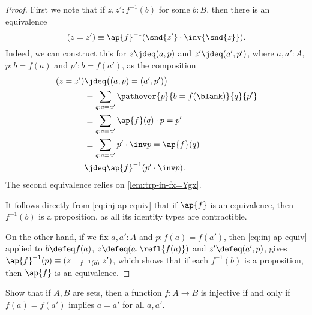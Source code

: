 \begin{proof}
  First we note that if $z,z' : f^{-1}(b)$ for some $b:B$,
  then there is an equivalence
  \begin{equation}\label{eq:inj-ap-equiv}
    (z = z') \equiv \ap{f}^{-1}(\snd{z'} \cdot \inv{\snd{z}}).
  \end{equation}
  Indeed, we can construct this for $z\jdeq(a,p)$ and $z'\jdeq(a',p')$,
  where $a,a':A$, $p:b=f(a)$ and $p':b=f(a')$,
  as the composition
  \begin{align*}
    (z = z')
    &\jdeq \bigl( (a,p) = (a',p') \bigr) \\
    &\equiv \sum_{q : a=a'} \pathover{p}{b=f(\blank)}{q}{p'} \\
    &\equiv \sum_{q : a=a'} \ap{f}(q) \cdot p = p' \\
    &\equiv \sum_{q : a=a'} p' \cdot \inv p = \ap{f}(q) \\
    &\jdeq \ap{f}^{-1}(p' \cdot \inv p).
  \end{align*}
  The second equivalence relies on \cref{lem:trp-in-fx=Ygx}.

  It follows directly from \eqref{eq:inj-ap-equiv}
  that if $\ap{f}$ is an equivalence,
  then $f^{-1}(b)$ is a proposition,
  as all its identity types are contractible.

  On the other hand, if we fix $a,a':A$ and $p:f(a)=f(a')$,
  then \eqref{eq:inj-ap-equiv} applied to $b \defeq f(a)$,
  $z \defeq (a,\refl{f(a)})$ and
  $z' \defeq (a',p)$,
  gives $\ap{f}^{-1}(p) \equiv (z=_{f^{-1}(b)}z')$,
  which shows that if each $f^{-1}(b)$ is a proposition,
  then $\ap{f}$ is an equivalence.
\end{proof}
\begin{xca}\label{xca:inj-sets}
  Show that if $A,B$ are sets, then a function
  $f : A \to B$ is injective if and only if
  $f(a)=f(a')$ implies $a=a'$ for all $a,a'$.
\end{xca}

